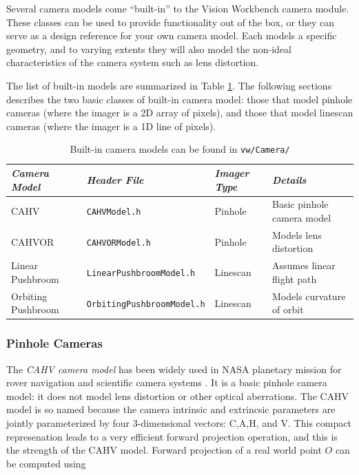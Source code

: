 Several camera models come ``built-in'' to the Vision Workbench camera
module.  These classes can be used to provide functionality out of the
box, or they can serve as a design reference for your own camera
model.  Each models a specific geometry, and to varying extents they
will also model the non-ideal characteristics of the camera system
such as lens distortion.  

The list of built-in models are summarized in Table
\ref{tab:camera-models}.  The following sections describes the two
basic classes of built-in camera model: those that model pinhole
cameras (where the imager is a 2D array of pixels), and those that
model linescan cameras (where the imager is a 1D line of pixels).

\begin{table}[tdp]
\begin{center}
\begin{tabular}{|l|l|l|l|}
\hline
{\em Camera Model} & {\em Header File} & {\em Imager Type} & {\em Details}\\
\hline CAHV         & {\tt CAHVModel.h} & Pinhole     & Basic pinhole camera model \\
CAHVOR       & {\tt CAHVORModel.h} & Pinhole     & Models lens distortion\\
Linear Pushbroom    & {\tt LinearPushbroomModel.h} & Linescan & Assumes linear flight path \\
Orbiting Pushbroom & {\tt OrbitingPushbroomModel.h} & Linescan & Models curvature of orbit \\
\hline
\end{tabular}
\end{center}
\label{tab:camera-models}
\caption{Built-in camera models can be found in {\tt vw/Camera/} }
\end{table}

\subsubsection{Pinhole Cameras}


The {\em CAHV camera model} has been widely used in NASA planetary mission
for rover navigation and scientific camera systems
\cite{yakimovsky78}.  It is a basic pinhole camera model: it does not
model lens distortion or other optical aberrations.  The CAHV model is
so named because the camera intrinsic and extrincsic parameters are
jointly parameterized by four 3-dimensional vectors: C,A,H, and V.
This compact represenation leads to a very efficient forward
projection operation, and this is the strength of the CAHV model.
Forward projection of a real world point $O$ can be computed using

